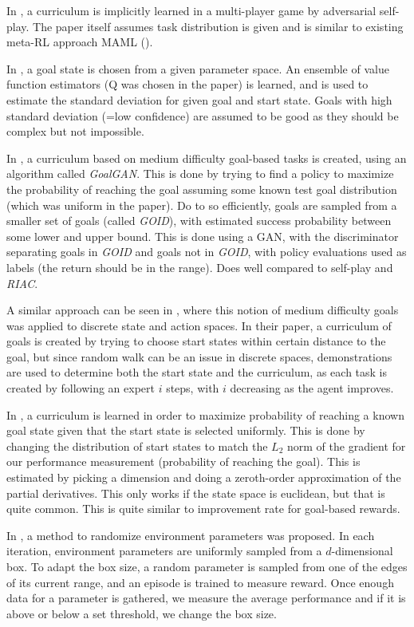 \documentclass[letterpaper]{article}
\theoremstyle{definition}
\begin{document}
In \cite{Al-Shedivat2017}, a curriculum is implicitly learned in a multi-player game by adversarial self-play. The paper itself assumes task distribution is given and is similar to existing meta-RL approach MAML (\cite{Finn2017a}).

In \cite{Zhang2020}, a goal state is chosen from a given parameter space. An ensemble of value function estimators (Q was chosen in the paper) is learned, and is used to estimate the standard deviation for given goal and start state. Goals with high standard deviation (=low confidence) are assumed to be good as they should be complex but not impossible.

In \cite{Florensa2017, Florensa2018}, a curriculum based on medium difficulty goal-based tasks is created, using an algorithm called \textit{GoalGAN}. This is done by trying to find a policy to maximize the probability of reaching the goal assuming some known test goal distribution (which was uniform in the paper). Do to so efficiently, goals are sampled from a smaller set of goals (called \textit{GOID}), with estimated success probability between some lower and upper bound. This is done using a GAN, with the discriminator separating goals in \textit{GOID} and goals not in \textit{GOID}, with policy evaluations used as labels (the return should be in the range). Does well compared to self-play and \textit{RIAC}.

A similar approach can be seen in \cite{Srinivasan2019}, where this notion of medium difficulty goals was applied to discrete state and action spaces. In their paper, a curriculum of goals is created by trying to choose start states within certain distance to the goal, but since random walk can be an issue in discrete spaces, demonstrations are used to determine both the start state and the curriculum, as each task is created by following an expert $i$ steps, with $i$ decreasing as the agent improves.

In \cite{Wohlke2020}, a curriculum is learned in order to maximize probability of reaching a known goal state given that the start state is selected uniformly. This is done by changing the distribution of start states to match the $L_2$ norm of the gradient for our performance measurement (probability of reaching the goal). This is estimated by picking a dimension and doing a zeroth-order approximation of the partial derivatives. This only works if the state space is euclidean, but that is quite common. This is quite similar to improvement rate for goal-based rewards.

In \cite{Akkaya2019}, a method to randomize environment parameters was proposed. In each iteration, environment parameters are uniformly sampled from a $d$-dimensional box. To adapt the box size, a random parameter is sampled from one of the edges of its current range, and an episode is trained to measure reward. Once enough data for a parameter is gathered, we measure the average performance and if it is above or below a set threshold, we change the box size. 
\end{document}
